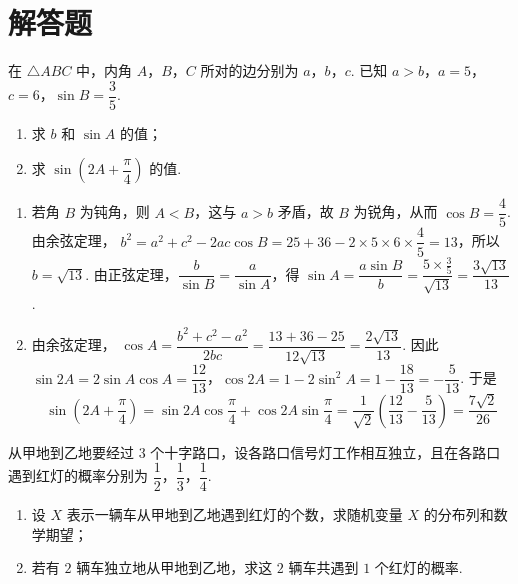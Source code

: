 \section{解答题}

\begin{problem}
在 \(\triangle ABC\) 中，内角 \(A\)，\(B\)，\(C\) 所对的边分别为 \(a\)，\(b\)，\(c\). 已知 \(a>b\)，\(a=5\)，\(c=6\)，\(\sin B=\dfrac{3}{5}\).

\begin{enumerate}
\item 求 \(b\) 和 \(\sin A\) 的值；
\item 求 \(\sin\left( 2A+\dfrac{\pi}{4} \right)\) 的值.
\end{enumerate}
\end{problem}

\begin{solution}
\begin{enumerate}
\item 若角 \(B\) 为钝角，则 \(A<B\)，这与 \(a>b\) 矛盾，故 \(B\) 为锐角，从而 \(\cos B=\dfrac45\). 由余弦定理，
\(b^2=a^2+c^2-2ac\cos B=25+36-2\times5\times6\times\dfrac45=13\)，所以 \(b=\sqrt{13}\).
由正弦定理，\(\dfrac{b}{\sin B}=\dfrac{a}{\sin A}\)，得
\(\sin A=\dfrac{a\sin B}{b}=\dfrac{5\times\frac35}{\sqrt{13}}=\dfrac{3\sqrt{13}}{13}\).

\item 由余弦定理，
\(\cos A=\dfrac{b^2+c^2-a^2}{2bc}=\dfrac{13+36-25}{12\sqrt{13}}=\dfrac{2\sqrt{13}}{13}\). 因此
\(\sin2A=2\sin A\cos A=\dfrac{12}{13}\)，\(\cos2A=1-2\sin^2A=1-\dfrac{18}{13}=-\dfrac5{13}\).
于是
\[
\sin\left(2A+\frac\pi4\right)=\sin2A\cos\frac\pi4+\cos2A\sin\frac\pi4
=\frac{1}{\sqrt2}\left(\frac{12}{13}-\frac5{13}\right)=\frac{7\sqrt2}{26}
\]
\end{enumerate}
\end{solution}

\begin{problem}
从甲地到乙地要经过 \(3\) 个十字路口，设各路口信号灯工作相互独立，且在各路口遇到红灯的概率分别为 \(\dfrac{1}{2}\)，\(\dfrac{1}{3}\)，\(\dfrac{1}{4}\).

\begin{enumerate}
\item 设 \(X\) 表示一辆车从甲地到乙地遇到红灯的个数，求随机变量 \(X\) 的分布列和数学期望；
\item 若有 \(2\) 辆车独立地从甲地到乙地，求这 \(2\) 辆车共遇到 \(1\) 个红灯的概率.
\end{enumerate}
\end{problem}


